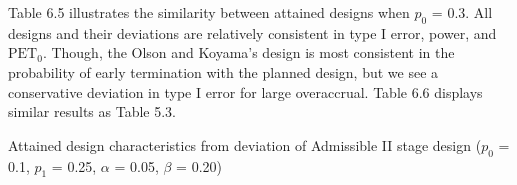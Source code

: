 \documentclass[12pt]{report}\usepackage[]{graphicx}\usepackage[]{color}
\newlength{\li}\setlength{\li}{14.48pt}
\newlength{\di}\setlength{\di}{-3.5mm}
\begin{document}
\indent Table 6.5 illustrates the similarity between attained designs when $p_0$ = 0.3. All designs and their deviations are relatively consistent in type I error, power, and $\mbox{PET}_0$. Though, the Olson and Koyama's design is most consistent in the probability of early termination with the planned design, but we see a conservative deviation in type I error for large overaccrual. Table 6.6 displays similar results as Table 5.3. \\




\begin{landscape}

\begin{table}[]
\caption{Attained design characteristics from deviation of Admissible II stage design ($p_0$ = 0.1, $p_1$ = 0.25, $\alpha$ = 0.05, $\beta$ = 0.20)}
\small
  \resizebox{\columnwidth}{!}{%

}
\end{table}
\end{landscape}
\end{document}
